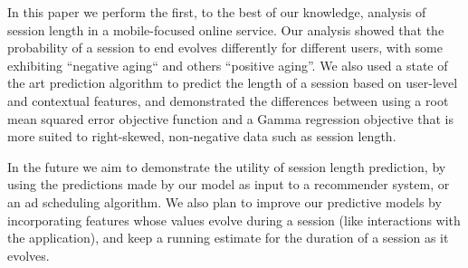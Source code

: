 %

In this paper we perform the first, to the best of our knowledge, analysis of session
length in a mobile-focused online service.
Our analysis showed that the probability of a session to end evolves differently
for different users, with some exhibiting ``negative aging`` and others
``positive aging''.
We also used a state of the art prediction algorithm to predict the length
of a session based on user-level and contextual features, and demonstrated the differences
between using a root mean squared error objective function and a Gamma regression
objective that is more suited to right-skewed, non-negative data such as session length.


In the future we aim to demonstrate the utility of session length prediction,
by using the predictions made by our model as input to a recommender system,
or an ad scheduling algorithm.
We also plan to improve our predictive models by incorporating features
whose values evolve during a session (like interactions with the application), and keep a running
estimate for the duration of a session as it evolves.
